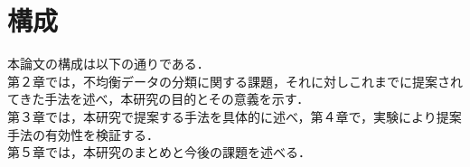 \section{構成}
本論文の構成は以下の通りである．\\
第２章では，不均衡データの分類に関する課題，それに対しこれまでに提案されてきた手法を述べ，本研究の目的とその意義を示す．\\
第３章では，本研究で提案する手法を具体的に述べ，第４章で，実験により提案手法の有効性を検証する．\\
第５章では，本研究のまとめと今後の課題を述べる．\\